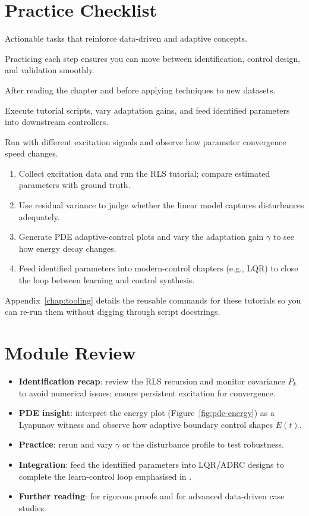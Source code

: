 \section{Practice Checklist}
\begin{beginnerguide}
    \item[\textbf{What?}] Actionable tasks that reinforce data-driven and adaptive concepts.
    \item[\textbf{Why?}] Practicing each step ensures you can move between identification, control design, and validation smoothly.
    \item[\textbf{When?}] After reading the chapter and before applying techniques to new datasets.
    \item[\textbf{How?}] Execute tutorial scripts, vary adaptation gains, and feed identified parameters into downstream controllers.
    \item[\textbf{Example}] Run  with different excitation signals and observe how parameter convergence speed changes.
\end{beginnerguide}
\begin{enumerate}[leftmargin=*]
    \item Collect excitation data and run the RLS tutorial; compare estimated parameters with ground truth.
    \item Use residual variance to judge whether the linear model captures disturbances adequately.
    \item Generate PDE adaptive-control plots and vary the adaptation gain $\gamma$ to see how energy decay changes.
    \item Feed identified parameters into modern-control chapters (e.g., LQR) to close the loop between learning and control synthesis.
\end{enumerate}
Appendix~\ref{chap:tooling} details the reusable commands for these tutorials so you can re-run them without digging through script docstrings.

\section{Module Review}
\begin{itemize}[leftmargin=*]
    \item \textbf{Identification recap}: review the RLS recursion and monitor covariance $P_k$ to avoid numerical issues; ensure persistent excitation for convergence.
    \item \textbf{PDE insight}: interpret the energy plot (Figure~\ref{fig:pde-energy}) as a Lyapunov witness and observe how adaptive boundary control shapes $E(t)$.
    \item \textbf{Practice}: rerun  and vary $\gamma$ or the disturbance profile to test robustness.
    \item \textbf{Integration}: feed the identified parameters into LQR/ADRC designs to complete the learn-control loop emphasised in \textcite{ljung2012control}.
    \item \textbf{Further reading}: \textcite{krstic1995nonlinear} for rigorous proofs and \textcite{ljung2012control} for advanced data-driven case studies.
\end{itemize}

